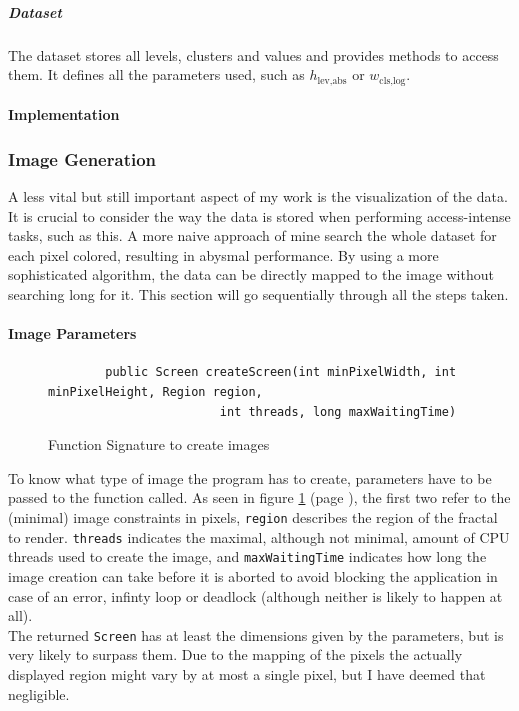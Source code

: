 \documentclass[10pt,a4paper,titlepage]{article}
\begin{document}
	\subparagraph{Dataset}
	The dataset stores all levels, clusters and values and provides methods to access them. It defines all the parameters used, such as \(h_{\text{lev,abs}}\) or \(w_{\text{cls,log}}\).
	\paragraph{Implementation}
	
	\subsubsection{Image Generation}
	A less vital but still important aspect of my work is the visualization of the data. It is crucial to consider the way the data is stored when performing access-intense tasks, such as this. A more naive approach of mine search the whole dataset for each pixel colored, resulting in abysmal performance. By using a more sophisticated algorithm, the data can be directly mapped to the image without searching long for it. This section will go sequentially through all the steps taken.
	\paragraph{Image Parameters}
	\begin{figure}
		\centering
		\caption{Function Signature to create images}
		\label{fig:image_signature}
		\begin{verbatim}
		public Screen createScreen(int minPixelWidth, int minPixelHeight, Region region,
		                int threads, long maxWaitingTime)
		\end{verbatim}
	\end{figure}
	To know what type of image the program has to create, parameters have to be passed to the function called. As seen in figure \ref{fig:image_signature} (page \pageref{fig:image_signature}), the first two refer to the (minimal) image constraints in pixels, \verb|region| describes the region of the fractal to render. \verb|threads| indicates the maximal, although not minimal, amount of CPU threads used to create the image, and \verb|maxWaitingTime| indicates how long the image creation can take before it is aborted to avoid blocking the application in case of an error, infinty loop or deadlock (although neither is likely to happen at all).\\
	The returned \verb|Screen| has at least the dimensions given by the parameters, but is very likely to surpass them. Due to the mapping of the pixels the actually displayed region might vary by at most a single pixel, but I have deemed that negligible.	
\end{document}
